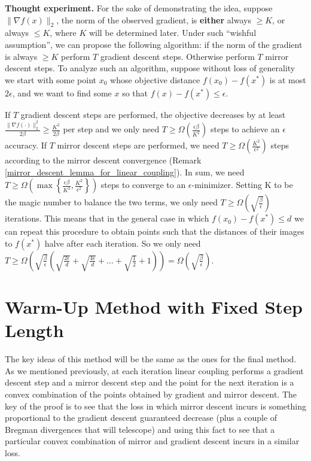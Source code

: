 \textbf{Thought experiment.} For the sake of demonstrating the idea, suppose $\| \nabla f(x) \|_2$, the norm of the observed gradient, is \textbf{either} always $\geq K$, or always $\leq K$, where $K$ will be determined later. Under such ``wishful assumption'', we can propose the following algorithm: if the norm of the gradient is always $\geq K$ perform $T$ gradient descent steps. Otherwise perform $T$ mirror descent steps. To analyze such an algorithm, suppose without loss of generality we start with some point $x_0$ whose objective distance $f(x_0 )-f(x^\ast )$ is at most $2\epsilon$, and we want to find some $x$ so that $f(x) - f(x^\ast) \leq \epsilon$.

If $T$ gradient descent steps are performed, the objective decreases by at least $\frac{\|\nabla f(\cdot)\|_2^2}{2\beta} \geq \frac{K^2}{2\beta}$ per step and we only need $T \geq \Omega\left(\frac{\epsilon \beta}{K^2}\right)$ steps to achieve an $\epsilon$ accuracy. If $T$ mirror descent steps are performed, we need $T \geq \Omega\left(\frac{K^2}{\epsilon^2}\right)$ steps according to the mirror descent convergence (Remark \ref{mirror_descent_lemma_for_linear_coupling}). In sum, we need $T \geq \Omega\left( \max \left\{ \frac{\epsilon \beta}{K^2}, \frac{K^2}{\epsilon^2}\right\}\right)$ steps to converge to an $\epsilon$-minimizer. Setting K to be the magic number to balance the two terms, we only need $T \geq \Omega\left( \sqrt{\frac{\beta}{\epsilon}}\right)$ iterations. This means that in the general case in which $f(x_0) - f(x^\ast) \leq d $ we can repeat this procedure to obtain points such that the distances of their images to $f(x^\ast)$ halve after each iteration. So we only need $T \geq \Omega \left(\sqrt{\frac{\beta}{\epsilon}}\left(\sqrt{\frac{2\epsilon}{d}} + \sqrt{\frac{4\epsilon}{d}} + \dots + \sqrt{\frac{1}{2} }+ 1 \right)\right) = \Omega \left( \sqrt{\frac{\beta}{\epsilon}}\right)$.

\section{Warm-Up Method with Fixed Step Length}
The key ideas of this method will be the same as the ones for the final method. As we mentioned previously, at each iteration linear coupling performs a gradient descent step and a mirror descent step and the point for the next iteration is a convex combination of the points obtained by gradient and mirror descent. The key of the proof is to see that the loss in which mirror descent incurs is something proportional to the gradient descent guaranteed decrease (plus a couple of Bregman divergences that will telescope) and using this fact to see that a particular convex combination of mirror and gradient descent incurs in a similar loss.

